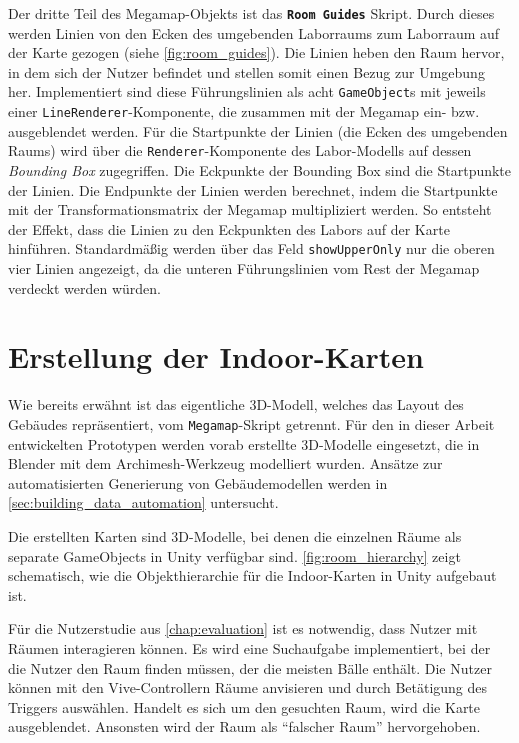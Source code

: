 Der dritte Teil des Megamap-Objekts ist das \textbf{\lstinline|Room Guides|} Skript.
Durch dieses werden Linien von den Ecken des umgebenden Laborraums zum Laborraum auf der Karte gezogen (siehe \autoref{fig:room_guides}).
Die Linien heben den Raum hervor, in dem sich der Nutzer befindet und stellen somit einen Bezug zur Umgebung her.
Implementiert sind diese Führungslinien als acht \lstinline|GameObject|s mit jeweils einer \lstinline|LineRenderer|-Komponente, die zusammen mit der Megamap ein- bzw. ausgeblendet werden.
Für die Startpunkte der Linien (die Ecken des umgebenden Raums) wird über die \lstinline|Renderer|-Komponente des Labor-Modells auf dessen \emph{Bounding Box} zugegriffen.
Die Eckpunkte der Bounding Box sind die Startpunkte der Linien.
Die Endpunkte der Linien werden berechnet, indem die Startpunkte mit der Transformationsmatrix der Megamap multipliziert werden.
So entsteht der Effekt, dass die Linien zu den Eckpunkten des Labors auf der Karte hinführen.
Standardmäßig werden über das Feld \lstinline|showUpperOnly| nur die oberen vier Linien angezeigt, da die unteren Führungslinien vom Rest der Megamap verdeckt werden würden.

\section{Erstellung der Indoor-Karten}
\label{sec:indoor_maps}
Wie bereits erwähnt ist das eigentliche 3D-Modell, welches das Layout des Gebäudes repräsentiert, vom \lstinline|Megamap|-Skript getrennt.
Für den in dieser Arbeit entwickelten Prototypen werden vorab erstellte 3D-Modelle eingesetzt, die in Blender mit dem Archimesh-Werkzeug modelliert wurden.
Ansätze zur automatisierten Generierung von Gebäudemodellen werden in \autoref{sec:building_data_automation} untersucht.

Die erstellten Karten sind 3D-Modelle, bei denen die einzelnen Räume als separate GameObjects in Unity verfügbar sind.
\autoref{fig:room_hierarchy} zeigt schematisch, wie die Objekthierarchie für die Indoor-Karten in Unity aufgebaut ist.

Für die Nutzerstudie aus \autoref{chap:evaluation} ist es notwendig, dass Nutzer mit Räumen interagieren können.
Es wird eine Suchaufgabe implementiert, bei der die Nutzer den Raum finden müssen, der die meisten Bälle enthält.
Die Nutzer können mit den Vive-Controllern Räume anvisieren und durch Betätigung des Triggers auswählen.
Handelt es sich um den gesuchten Raum, wird die Karte ausgeblendet.
Ansonsten wird der Raum als \enquote{falscher Raum} hervorgehoben.


